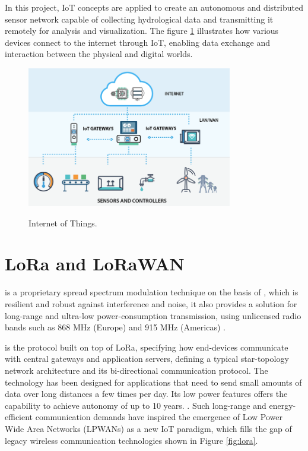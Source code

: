 In this project, \gls{IoT} concepts are applied to create an autonomous and distributed sensor network capable of collecting hydrological data and transmitting it remotely for analysis and visualization. The figure \ref{fig:iot} illustrates how various devices connect to the internet through \gls{IoT}, enabling data exchange and interaction between the physical and digital worlds. \cite{javaid_2021_sensors}

\begin{figure}[h]
    \centering
    \caption{Internet of Things.}
    \includegraphics[width=0.8\textwidth]{figuras/iot.png}
    \label{fig:iot}
\end{figure}

\section{LoRa and LoRaWAN}

 is a proprietary spread spectrum modulation technique on the basis of , which is resilient and robust against interference and noise, it also provides a solution for long-range and ultra-low power-consumption transmission, using unlicensed radio bands such as 868 MHz (Europe) and 915 MHz (Americas) \cite{sun_2022_recent}.

 is the  protocol built on top of \gls{LoRa}, specifying how end-devices communicate with central gateways and application servers,  defining a typical star-topology network architecture and its bi-directional communication protocol. The technology has been designed for applications that need to send small amounts of data over long distances a few times per day. Its low power features offers the capability to achieve autonomy of up to 10 years. \cite{pule_2017_wireless,sun_2022_recent}. Such long-range and energy-efficient communication demands have inspired the emergence of Low Power Wide Area Networks (LPWANs) as a new \gls{IoT} paradigm, which fills the gap of legacy wireless communication technologies shown in Figure \ref{fig:lora}. 

